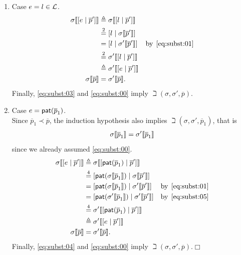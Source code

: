 \begin{enumerate}
\begin{enumerate}
      \item Case \(e = l \in {\cal L}\).
        \begin{align}
          \subst{\cons{e}{\overline{p}'}}{\sigma}
          &\triangleq \subst{\cons{l}{\overline{p}'}}{\sigma}\notag\\
          &\eqn{2} \cons{l}{\subst{\overline{p}'}{\sigma}}\notag\\
          &= \cons{l}{\subst{\overline{p}'}{\sigma'}}
          & \text{by} \,\; \eqref{eq:subst:01}\notag\\
          &\eqn{2} \subst{\cons{l}{\overline{p}'}}{\sigma'}\notag\\
          &\triangleq \subst{\cons{e}{\overline{p}'}}{\sigma'}\notag\\
          \subst{\overline{p}}{\sigma}
          &= \subst{\overline{p}}{\sigma'}. \label{eq:subst:03}
        \end{align}
        Finally, \eqref{eq:subst:03} and \eqref{eq:subst:00} imply
        \(\beth(\sigma, \sigma', \overline{p})\).

  \item Case \(e = \pat{\overline{p}_1}\).\\ Since \(\overline{p}_1
    \prec \overline{p}\), the induction hypothesis also implies
    \(\beth(\sigma, \sigma', \overline{p}_1)\), that is
    \begin{gather}
      \subst{\overline{p}_1}{\sigma} =
      \subst{\overline{p}_1}{\sigma'} \label{eq:subst:05}
    \end{gather}
    since we already assumed \eqref{eq:subst:00}.
    \begin{align}
      \subst{\cons{e}{\overline{p}'}}{\sigma}
       &\triangleq
      \subst{\cons{\pat{\overline{p}_1}}{\overline{p}'}}{\sigma}\notag\\
      &\eqn{4}
      \cons{\pat{\subst{\overline{p}_1}{\sigma}}}%
           {\subst{\overline{p}'}{\sigma}}\notag\\
      &= \cons{\pat{\subst{\overline{p}_1}{\sigma}}}%
              {\subst{\overline{p}'}{\sigma'}}
      & \text{by} \,\; \eqref{eq:subst:01}\notag\\
      &= \cons{\pat{\subst{\overline{p}_1}{\sigma'}}}%
              {\subst{\overline{p}'}{\sigma'}}
      & \text{by} \,\; \eqref{eq:subst:05}\notag\\
      &\eqn{4} \subst{\cons{\pat{\overline{p}_1}}{\overline{p}'}}%
                     {\sigma'}\notag\\
      &\triangleq \subst{\cons{e}{\overline{p}'}}{\sigma'}\notag\\
         \subst{\overline{p}}{\sigma}
      &= \subst{\overline{p}}{\sigma'}. \label{eq:subst:04}
    \end{align}
    Finally, \eqref{eq:subst:04} and \eqref{eq:subst:00} imply
    \(\beth(\sigma, \sigma', \overline{p})\).\hfill \(\Box\)

    \end{enumerate}

\end{enumerate}
